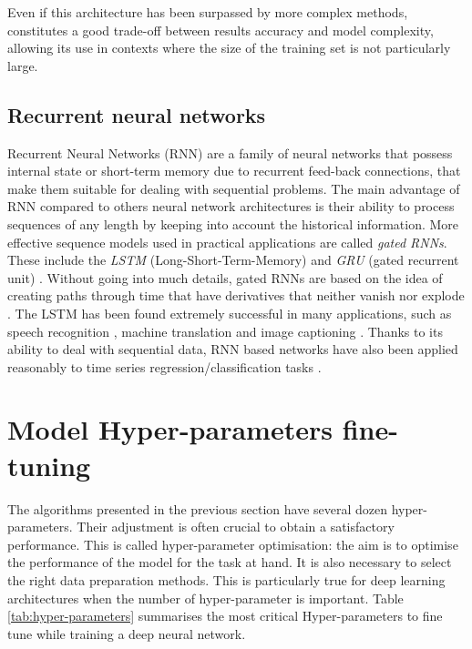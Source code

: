 Even if this architecture has been surpassed by more complex methods, constitutes a good trade-off between results accuracy and model complexity, allowing its use in contexts where the size of the training set is not particularly large.


\subsection{Recurrent neural networks} \label{Recurrent Neural Network}

Recurrent Neural Networks (RNN) \citep{rumelhart1986learning} are a family of neural networks that possess internal state or short-term memory due to recurrent feed-back connections, that make them suitable for dealing with sequential problems. The main advantage of RNN compared to others neural network architectures is their ability to process sequences of any length by keeping into account the historical information. More effective sequence models used in practical applications are called \textit{gated RNNs}. These include the \textit{LSTM} (Long-Short-Term-Memory) \citep{hochreiter1997long} and \textit{GRU} (gated recurrent unit) \citep{cho2014properties}. Without going into much details, gated RNNs are based on the idea of creating paths through time that have derivatives that neither vanish nor explode \citep{goodfellow2016deep}. The LSTM has been found extremely successful in many applications, such as speech recognition \citep{graves2013hybrid}\citep{graves2014towards}, machine translation \citep{sutskever2014sequence} and image captioning \citep{kiros2014unifying}\citep{vinyals2015show}\citep{xu2015show}. Thanks to its ability to deal with sequential data, RNN based networks have also been applied reasonably to time series regression/classification tasks \citep{smirnov2018time}.  

\section{Model Hyper-parameters fine-tuning}

The algorithms presented in the previous section have several dozen hyper-parameters. Their adjustment is often crucial to obtain a satisfactory performance. This is called hyper-parameter optimisation: the aim is to optimise the performance of the model for the task at hand. It is also necessary to select the right data preparation methods. This is particularly true for deep learning architectures when the number of hyper-parameter is important. Table \ref{tab:hyper-parameters} summarises the most critical Hyper-parameters to fine tune while training a deep neural network.

